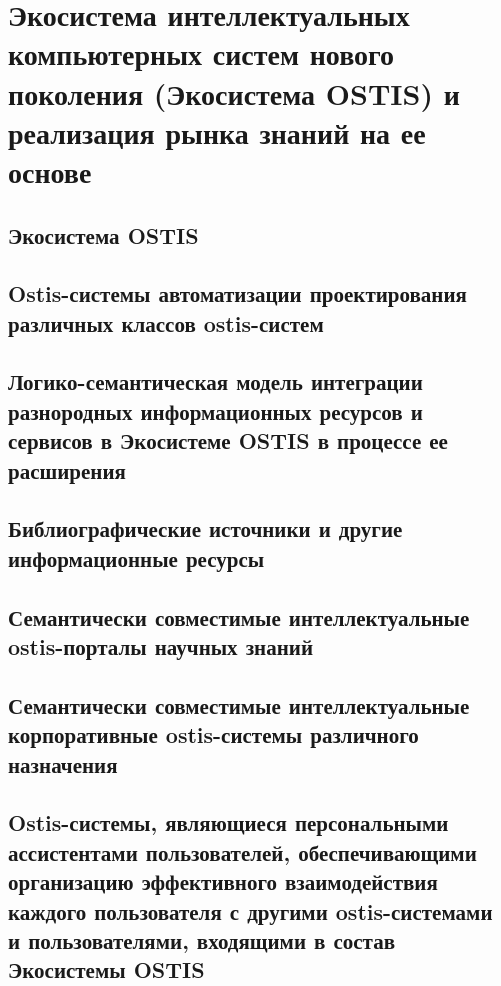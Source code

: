 \chapter{Экосистема интеллектуальных компьютерных систем нового поколения (Экосистема OSTIS) и реализация рынка знаний на ее основе}
\label{chapter_ecosystem}


\section{Экосистема OSTIS}
\section{Ostis-системы автоматизации проектирования различных классов ostis-систем}
\section{Логико-семантическая модель интеграции разнородных информационных ресурсов и сервисов в Экосистеме OSTIS в процессе ее расширения}
\section{Библиографические источники и другие информационные ресурсы}
\section{Семантически совместимые интеллектуальные ostis-порталы научных знаний}
\section{Семантически совместимые интеллектуальные корпоративные ostis-системы различного назначения}
\section{Ostis-системы, являющиеся персональными ассистентами пользователей, обеспечивающими организацию эффективного взаимодействия каждого пользователя с другими ostis-системами и пользователями, входящими в состав Экосистемы OSTIS}

%